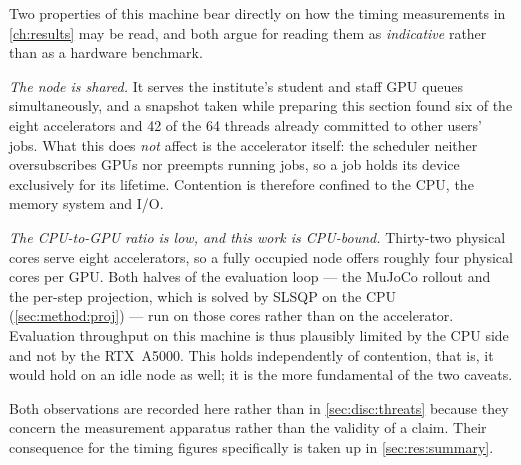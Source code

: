 Two properties of this machine bear directly on how the timing measurements in
\autoref{ch:results} may be read, and both argue for reading them as \emph{indicative} rather than as
a hardware benchmark.

\emph{The node is shared.} It serves the institute's student and staff GPU queues simultaneously,
and a snapshot taken while preparing this section found six of the eight accelerators and 42 of the
64 threads already committed to other users' jobs. What this does \emph{not} affect is the
accelerator itself: the scheduler neither oversubscribes GPUs nor preempts running jobs, so a job
holds its device exclusively for its lifetime. Contention is therefore confined to the CPU, the
memory system and I/O.

\emph{The CPU-to-GPU ratio is low, and this work is CPU-bound.} Thirty-two physical cores serve
eight accelerators, so a fully occupied node offers roughly four physical cores per GPU. Both halves
of the evaluation loop --- the MuJoCo rollout and the per-step projection, which is solved by SLSQP
on the CPU (\autoref{sec:method:proj}) --- run on those cores rather than on the accelerator.
Evaluation throughput on this machine is thus plausibly limited by the CPU side and not by the
RTX~A5000. This holds independently of contention, that is, it would hold on an idle node as well;
it is the more fundamental of the two caveats.

Both observations are recorded here rather than in \autoref{sec:disc:threats} because they concern
the measurement apparatus rather than the validity of a claim. Their consequence for the timing
figures specifically is taken up in \autoref{sec:res:summary}.

